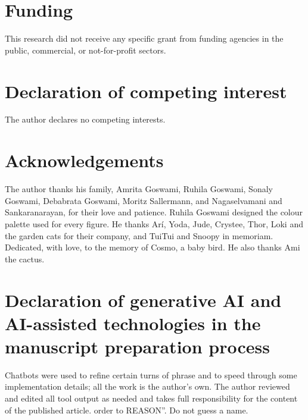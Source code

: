 \documentclass[preprint,12pt]{elsarticle}
\begin{document}
\section*{Funding} \label{sec:funding} This research did not receive any
specific grant from funding agencies in the public, commercial, or
not-for-profit sectors.

\section*{Declaration of competing interest} \label{sec:competing} The
author declares no competing interests.


\section*{Acknowledgements}\label{sec:acknowledgements} The author
thanks his family, Amrita Goswami, Ruhila Goswami, Sonaly Goswami,
Debabrata Goswami, Moritz Sallermann, and Nagaselvamani and
Sankaranarayan, for their love and patience.
Ruhila Goswami designed the colour palette used for every figure.
He thanks Arí, Yoda, Jude, Crystee, Thor, Loki and the garden cats for
their company, and TuiTui and Snoopy in memoriam.
Dedicated, with love, to the memory of Cosmo, a baby bird.
He also thanks Ami the cactus.

\section*{Declaration of generative AI and AI-assisted technologies in the manuscript preparation process}\label{sec:ai-declaration}
Chatbots were used to refine certain turns of phrase and to speed
through some implementation details; all the work is the author's own.
The author reviewed and edited all tool output as needed and takes full
responsibility for the content of the published article.
order to REASON''.
Do not guess a name.

\FloatBarrier \raggedright



 
\end{document}
